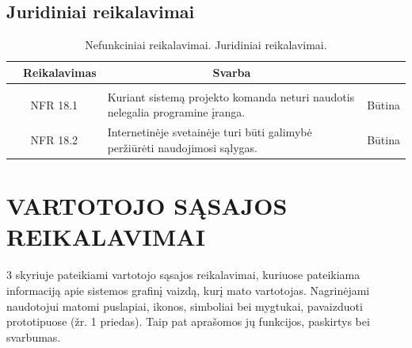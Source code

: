 \documentclass{VUMIFPSkursinis}
\begin{document}
\subsection{Juridiniai reikalavimai}
\begin{table}[H]
	\caption{Nefunkciniai reikalavimai. Juridiniai reikalavimai.}
	\begin{tabular}{|p{1cm}|p{1cm}|p{}|p{}|}
	\hline 
\rowcolor{gray!50}
		\multicolumn{2}{|c|}{{\bfseries Kodas}}&
		\multicolumn{1}{c|}{{\bfseries Reikalavimas}}&
		\multicolumn{1}{c|}{{\bfseries Svarba}}\\
\hline
\rowcolor{lightgray}
\multicolumn{4}{|c|}{Juridiniai reikalavimai}\\		

\hline
	\multicolumn{2}{|c|}{NFR 18.1}&
	{Kuriant sistemą projekto komanda neturi naudotis nelegalia
programine įranga.
}&		
	\multicolumn{1}{c|}{Būtina}\\
	
\hline
	\multicolumn{2}{|c|}{NFR 18.2}&
	{Internetinėje svetainėje turi būti galimybė peržiūrėti naudojimosi sąlygas.
}&		
	\multicolumn{1}{c|}{Būtina}\\				
	\hline
	\end{tabular}		
	\end{table}
\newpage

\section{VARTOTOJO SĄSAJOS REIKALAVIMAI}
3 skyriuje pateikiami vartotojo sąsajos reikalavimai, kuriuose pateikiama informaciją apie sistemos grafinį vaizdą, kurį mato vartotojas. Nagrinėjami naudotojui matomi puslapiai, ikonos, simboliai bei mygtukai, pavaizduoti prototipuose (žr. 1 priedas). Taip pat aprašomos jų funkcijos, paskirtys bei svarbumas.
\end{document}
